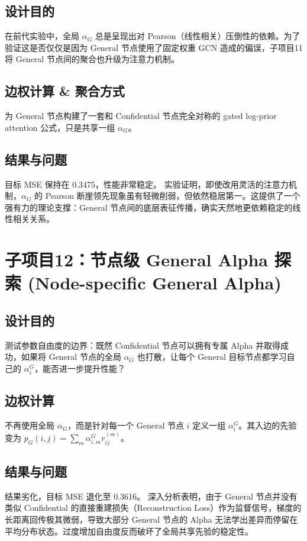 \documentclass[UTF8]{ctexart}
\begin{document}
\subsection{设计目的}
在前代实验中，全局 $\alpha_G$ 总是呈现出对 Pearson（线性相关）压倒性的依赖。为了验证这是否仅仅是因为 General 节点使用了固定权重 GCN 造成的偏误，子项目11将 General 节点间的聚合也升级为注意力机制。

\subsection{边权计算 \& 聚合方式}
为 General 节点构建了一套和 Confidential 节点完全对称的 gated log-prior attention 公式，只是共享一组 $\alpha_G$。

\subsection{结果与问题}
目标 MSE 保持在 0.3475，性能非常稳定。
实验证明，即使改用灵活的注意力机制，$\alpha_G$ 的 Pearson 断崖领先现象虽有轻微削弱，但依然稳居第一。这提供了一个强有力的理论支撑：General 节点间的底层表征传播，确实天然地更依赖稳定的线性相关关系。

\section{子项目12：节点级 General Alpha 探索 (Node-specific General Alpha)}

\subsection{设计目的}
测试参数自由度的边界：既然 Confidential 节点可以拥有专属 Alpha 并取得成功，如果将 General 节点的全局 $\alpha_G$ 也打散，让每个 General 目标节点都学习自己的 $\alpha_i^G$，能否进一步提升性能？

\subsection{边权计算}
不再使用全局 $\alpha_G$，而是针对每一个 General 节点 $i$ 定义一组 $\alpha_i^G$。其入边的先验变为 $p_G(i,j) = \sum_m \alpha_{i,m}^G r_{ij}^{(m)}$。

\subsection{结果与问题}
结果劣化，目标 MSE 退化至 0.3616。
深入分析表明，由于 General 节点并没有类似 Confidential 的直接重建损失（Reconstruction Loss）作为监督信号，梯度的长距离回传极其微弱，导致大部分 General 节点的 Alpha 无法学出差异而停留在平均分布状态。过度增加自由度反而破坏了全局共享先验的稳定性。
\end{document}
